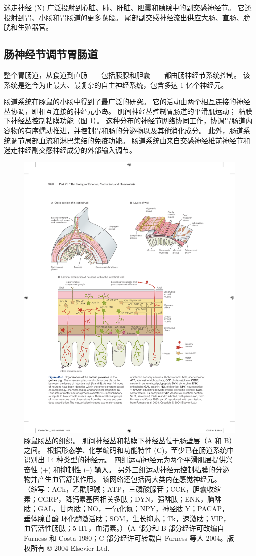 迷走神经 (X) 广泛投射到心脏、肺、肝脏、胆囊和胰腺中的副交感神经节。 它还投射到胃、小肠和胃肠道的更多喙段。 尾部副交感神经流出供应大肠、直肠、膀胱和生殖器官。

\subsection{肠神经节调节胃肠道}
整个胃肠道，从食道到直肠——包括胰腺和胆囊——都由肠神经节系统控制。 该系统是迄今为止最大、最复杂的自主神经系统，包含多达 1 亿个神经元。

肠道系统在豚鼠的小肠中得到了最广泛的研究。 它的活动由两个相互连接的神经丛协调，即相互连接的神经元小岛。 
肌间神经丛控制胃肠道的平滑肌运动； 粘膜下神经丛控制粘膜功能（图 \ref{fig:41_6}）。 
这种分布的神经节网络协同工作，协调胃肠道内容物的有序蠕动推进，并控制胃和肠的分泌物以及其他消化成分。 此外，肠道系统调节局部血流和淋巴集结的免疫功能。 肠道系统由来自交感神经椎前神经节和迷走神经副交感神经成分的外部输入调节。

\begin{figure}[htbp]
	\centering
	\includegraphics[width=0.9\linewidth]{chap41/fig_41_6}
	\caption{豚鼠肠丛的组织。 肌间神经丛和粘膜下神经丛位于肠壁层（A 和 B）之间。 根据形态学、化学编码和功能特性 (C)，至少已在肠道系统中识别出 14 种类型的神经元。 四组运动神经元为两个平滑肌层提供兴奋性 (+) 和抑制性 (–) 输入。 另外三组运动神经元控制粘膜的分泌物并产生血管舒张作用。 该网络还包括两大类内在感觉神经元。 （缩写：ACh，乙酰胆碱；ATP，三磷酸腺苷；CCK，胆囊收缩素；CGRP，降钙素基因相关多肽；DYN，强啡肽；ENK，脑啡肽；GAL，甘丙肽；NO，一氧化氮；NPY，神经肽 Y；PACAP，垂体腺苷酸 环化酶激活肽；SOM，生长抑素；Tk，速激肽；VIP，血管活性肠肽；5-HT，血清素。）（A 部分和 B 部分经许可改编自 Furness 和 Costa 1980；C 部分经许可转载自 Furness 等人 2004。版权所有 © 2004 Elsevier Ltd.}
	\label{fig:41_6}
\end{figure}

